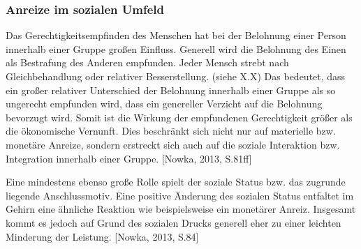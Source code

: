 \subsubsection{Anreize im sozialen Umfeld}
Das Gerechtigkeitsempfinden des Menschen hat bei der Belohnung einer Person innerhalb einer Gruppe großen Einfluss. Generell wird die Belohnung des Einen als Bestrafung des Anderen empfunden. Jeder Mensch strebt nach Gleichbehandlung oder relativer Besserstellung. (siehe X.X) Das bedeutet, dass ein großer relativer Unterschied der Belohnung innerhalb einer Gruppe als so ungerecht empfunden wird, dass ein genereller Verzicht auf die Belohnung bevorzugt wird. Somit ist die Wirkung der empfundenen Gerechtigkeit größer als die ökonomische Vernunft. Dies beschränkt sich nicht nur auf materielle bzw. monetäre Anreize, sondern erstreckt sich auch auf die soziale Interaktion bzw. Integration innerhalb einer Gruppe. [Nowka, 2013, S.81ff]
 
Eine mindestens ebenso große Rolle spielt der soziale Status bzw. das zugrunde liegende Anschlussmotiv. Eine positive Änderung des sozialen Status entfaltet im Gehirn eine ähnliche Reaktion wie beispielsweise ein monetärer Anreiz. Insgesamt kommt es jedoch auf Grund des sozialen Drucks generell eher zu einer leichten Minderung der Leistung. [Nowka, 2013, S.84]

